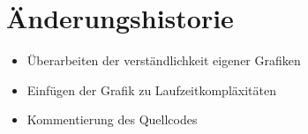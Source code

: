 \section*{Änderungshistorie}
    \begin{itemize}
        \item Überarbeiten der verständlichkeit eigener Grafiken
        \item Einfügen der Grafik zu Laufzeitkompläxitäten
        \item Kommentierung des Quellcodes
    \end{itemize}
